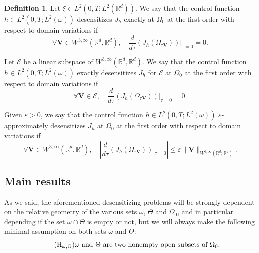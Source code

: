 \documentclass[10pt,a4paper]{amsart}
\newcommand{\bV}{\boldsymbol{V}}
\newcommand\R{{\mathbb R}}
\newcommand{\Hreg}{\mathrm{H}_{\omega,\Theta}}
\theoremstyle{definition}
\newtheorem{definition}[theorem]{Definition}
\begin{document}
\begin{definition}
Let {$\xi \in L^2(0,T; L^2(\R^d))$}.
We say that the control function $h \in L^2(0,T; L^2(\omega))$ desensitizes $J_h$ exactly at $\Omega_0$ at the first order with respect to domain variations if
\begin{equation}
\label{Exact-Insentitizing}
\forall\bV\in W^{3,\infty}(\R^d, \R^d),
\quad
\dfrac{d }{d \tau}\left(J_h \left(\Omega_{\tau\bV} \right)\right)\Big|_{\tau=0}=0.
\end{equation}

Let $\mathcal{E}$ be a linear subspace of $W^{3,\infty}(\R^d, \R^d)$.
We say that the control function $h \in L^2(0,T; L^2(\omega))$ exactly desensitizes $J_h$ for $\mathcal{E}$ at $\Omega_0$ at the first order with respect to domain variations if
\begin{equation}
\label{Finite-Insensitizing}
\forall\bV\in \mathcal{E},
\quad
\dfrac{d }{d \tau}\left(J_h \left(\Omega_{\tau\bV} \right)\right)\Big|_{\tau=0}=0.
\end{equation}

Given $\varepsilon>0$, we say that the control function $h \in L^2(0,T; L^2(\omega))$ $\varepsilon$-approximately desensitizes $J_h$ at $\Omega_0$ at the first order with respect to domain variations if
\begin{equation}
\label{Approx-Insensitizing}
\forall\bV\in W^{3,\infty}(\R^d, \R^d),
\quad
\left|\dfrac{d }{d \tau}\left(J_h\left(\Omega_{\tau \bV}\right)\right)\Big|_{\tau=0}\right |\leq \varepsilon \| \bV \|_{W^{3, \infty}(\R^d; \R^d)}.
\end{equation}
\end{definition}

\subsection{Main results}
As we said, the aforementioned desensitizing problems will be strongly dependent on the relative geometry of the various sets $\omega$, $\Theta$ and $\Omega_0$, and in particular depending if the set $\omega \cap \Theta$ is empty or not{, but we will always make the following minimal assumption} on both sets $\omega$ and $\Theta$:
\begin{equation}\tag{$\Hreg$}\label{regMinOmThe}
\text{$\omega$ and $\Theta$ are two nonempty open subsets of $\Omega_0$.}
\end{equation}
\end{document}
